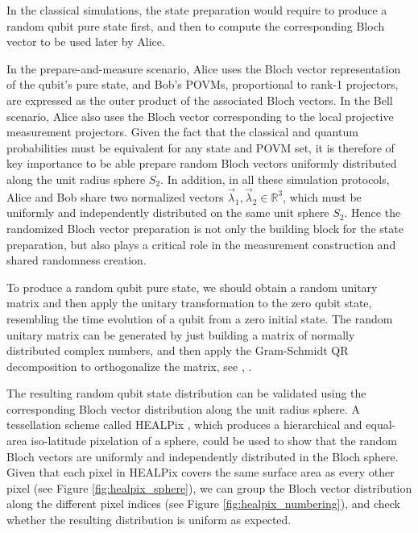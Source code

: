 In the classical simulations, the state preparation would require to produce a random qubit pure state first, and then to compute the corresponding Bloch vector to be used later by Alice. 

In the prepare-and-measure scenario, Alice uses the Bloch vector representation of the qubit's pure state, and Bob's POVMs,  proportional to rank-1 projectors, are expressed as the outer product of the associated Bloch vectors. In the Bell scenario, Alice also uses the Bloch vector corresponding to the local projective measurement projectors. Given the fact that the classical and quantum probabilities must be equivalent for any state and POVM set, it is therefore of key importance to be able prepare random Bloch vectors uniformly distributed along the unit radius sphere $S_2$. In addition, in all these simulation protocols, Alice and Bob share two normalized vectors $\vec{\lambda}_1, \vec{\lambda}_2 \in \mathbb{R}^{3}$, which must be uniformly and independently distributed on the same unit sphere $S_2$. Hence the randomized Bloch vector preparation is not only the building block for the state preparation, but also plays a critical role in the measurement construction and shared randomness creation.

To produce a random qubit pure state, we should obtain a random unitary matrix and then apply the unitary transformation to the zero qubit state, resembling the time evolution of a qubit from a zero initial state. The random unitary matrix can be generated by just building a matrix of normally distributed complex numbers, and then apply the Gram-Schmidt QR decomposition to orthogonalize the matrix, see \cite{ozols2009}, \cite{zyczkowski1994}. 

The resulting random qubit state distribution can be validated using the corresponding Bloch vector distribution along the unit radius sphere. A tessellation scheme called HEALPix \cite{healpix}, which produces a hierarchical and equal-area iso-latitude pixelation of a sphere, could be used to show that the random Bloch vectors are uniformly and independently distributed in the Bloch sphere. Given that each pixel in HEALPix covers the same surface area as every other pixel (see Figure \ref{fig:healpix_sphere}), we can group the Bloch vector distribution along the different pixel indices (see Figure \ref{fig:healpix_numbering}), and check whether the resulting distribution is uniform as expected.

